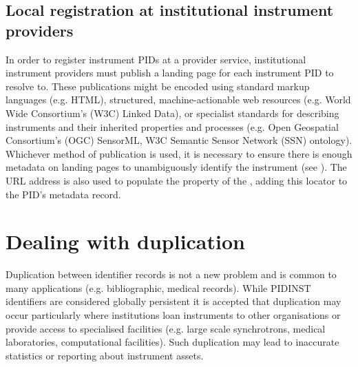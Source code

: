 \documentclass[a4paper,10pt,english]{sphinxmanual}
\begin{document}
\subsection{Local registration at institutional instrument providers}
\label{\detokenize{white-paper/registration:local-registration-at-institutional-instrument-providers}}
In order to register instrument PIDs at a provider service,
institutional instrument providers must publish a landing page for each
instrument PID to resolve to. These publications might be encoded using
standard markup languages (e.g. HTML), structured, machine-actionable
web resources (e.g. World Wide Consortium’s (W3C) Linked Data), or
specialist standards for describing instruments and their inherited
properties and processes (e.g. Open Geospatial Consortium’s (OGC)
SensorML, W3C Semantic Sensor Network (SSN) ontology). Whichever method
of publication is used, it is necessary to ensure there is enough
metadata on landing pages to unambiguously identify the instrument (see
{\hyperref[\detokenize{white-paper/landing-page-content:landing-page-content}]{}}). The URL address is also used to populate
the  property of the , adding this
locator to the PID’s metadata record.


\section{Dealing with duplication}
\label{\detokenize{white-paper/duplication:dealing-with-duplication}}\label{\detokenize{white-paper/duplication::doc}}
Duplication between identifier records is not a new problem and is
common to many applications (e.g. bibliographic, medical records). While
PIDINST identifiers are considered globally persistent it is accepted
that duplication may occur particularly where institutions loan
instruments to other organisations or provide access to specialised
facilities (e.g. large scale synchrotrons, medical laboratories,
computational facilities). Such duplication may lead to inaccurate
statistics or reporting about instrument assets.
\end{document}
